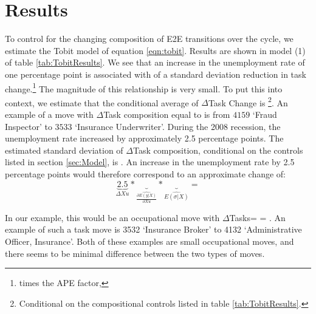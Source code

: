 \documentclass[11pt, oneside]{article}
\begin{document}
\section{Results}
\label{sec:results}




To control for the changing composition of E2E transitions over the cycle, we estimate the Tobit model of equation \ref{eqn:tobit}. Results are shown in model (1) of table \ref{tab:TobitResults}. We see that an increase in the unemployment rate of one percentage point is associated with \hspace{-1mm} of a standard deviation reduction in task change.\footnote{\hspace{-1mm} times the APE factor, \hspace{-1mm}} The magnitude of this relationship is very small. To put this into context, we estimate that the conditional average of $\Delta$Task Change is \hspace{-1mm}\footnote{Conditional on the compositional controls listed in table \ref{tab:TobitResults}.}. An example of a move with $\Delta$Task composition equal to \hspace{-1mm}  is from $4159$ `Fraud Inspector' to $3533$ `Insurance Underwriter'. During the 2008 recession, the unemployment rate increased by approximately 2.5 percentage points. The estimated standard deviation of $\Delta$Task composition, conditional on the controls listed in section \ref{sec:Model}, is \hspace{-1mm}. An increase in the unemployment rate by 2.5 percentage points would therefore correspond to an approximate change of:
\[
\underbrace{2.5}_{\Delta Xu}* \underbrace{}_{\widehat{\frac{\partial E(y| X)}{\partial Xu}}} *\underbrace{}_{ \widehat{E(\sigma|X)}} = 
\]

\noindent In our example, this would be an occupational move with $\Delta$Tasks=\hspace{-1mm}  =  \hspace{-1.5mm}. An example of such a task move is 3532 `Insurance Broker' to 4132 `Administrative Officer, Insurance'. Both of these examples are small occupational moves, and there seems to be minimal difference between the two types of moves.
\end{document}
